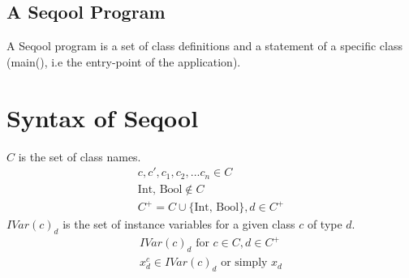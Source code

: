 \documentclass[]{article}
\begin{document}
\subsection{A Seqool Program}
A Seqool program is a set of class definitions and a statement of a specific class (main(), i.e the entry-point of the application).
\section{Syntax of Seqool}
$C$ is the set of class names.
\large
\begin{eqnarray*}
	\label{C - Class names}
	c,c',c_1,c_2,...c_n \in C \\
	\mbox{Int, Bool} \not\in C \\
	C^+ = C \cup \{\mbox{Int, Bool}\}, d \in C^+
\end{eqnarray*}
$IVar(c)_d$ is the set of instance variables for a given class $c$ of type $d$. 
\begin{eqnarray*}
	\label{IVar - Instance Variables}
	IVar(c)_d \mbox{ for } c \in C, d \in C^+\\
	x^{c}_{d}\in IVar(c)_d \mbox{ or simply } x_d
\end{eqnarray*}

\normalsize


\end{document}
